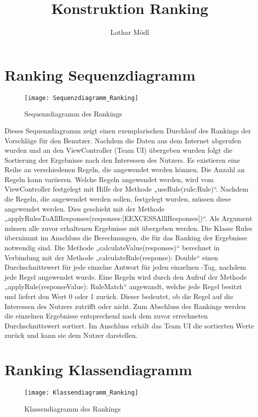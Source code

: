 
\title{Konstruktion Ranking}
\author{Lothar Mödl}

\section{Ranking Sequenzdiagramm}

\begin{figure}
	\centering
	\texttt{[image: Sequenzdiagramm\_Ranking]}
	\caption{Sequenzdiagramm des Rankings}
	\label{fig:Ranking Sequenzdiagramm}
\end{figure}

Dieses Sequenzdiagramm zeigt einen exemplarischen Durchlauf des Rankings der Vorschläge für den Benutzer. Nachdem die Daten aus dem Internet abgerufen wurden und an den ViewController (Team UI) übergeben wurden folgt die Sortierung der Ergebnisse nach den Interessen des Nutzers. Es existieren eine Reihe an verschiedenen Regeln, die angewendet werden können. Die Anzahl an Regeln kann variieren. Welche Regeln angewendet werden, wird vom ViewController festgelegt mit Hilfe der Methode „useRule(rule:Rule)“. Nachdem die Regeln, die angewendet werden sollen, festgelegt wurden, müssen diese angewendet werden. Dies geschieht mit der Methode „applyRulesToAllResponses(responses:[EEXCESSAlllResponses])“. Als Argument müssen alle zuvor erhaltenen Ergebnisse mit übergeben werden. Die Klasse Rules übernimmt im Anschluss die Berechnungen, die für das Ranking der Ergebnisse notwendig sind. Die Methode „calculateValue(responses)“ berechnet in Verbindung mit der Methode „calculateRule(response): Double“ einen Durchschnittswert für jede einzelne Antwort für jeden einzelnen \SEARCH-Tag, nachdem jede Regel angewendet wurde. Eine Regeln wird durch den Aufruf der Methode „applyRule(responseValue): RuleMatch“ angewandt, welche jede Regel besitzt und liefert den Wert 0 oder 1 zurück. Dieser bedeutet, ob die Regel auf die Interessen des Nutzers zutrifft oder nicht. Zum Abschluss des Rankings werden die einzelnen Ergebnisse entsprechend nach dem zuvor errechneten Durchschnittswert sortiert. Im Anschluss erhält das Team UI die sortierten Werte zurück und kann sie dem Nutzer darstellen. 

\pagebreak

\section{Ranking Klassendiagramm}

\begin{figure}
	\centering
	\texttt{[image: Klassendiagramm\_Ranking]}
	\caption{Klassendiagramm des Rankings}
	\label{fig:Ranking Klassendiagramm}
\end{figure}


